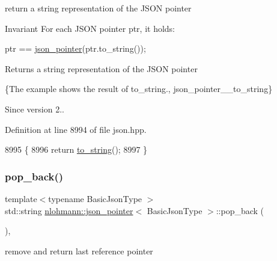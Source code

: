 return a string representation of the J\+S\+ON pointer 

\begin{DoxyInvariant}{Invariant}
For each J\+S\+ON pointer {\ttfamily ptr}, it holds\+: 
\begin{DoxyCode}
ptr == \hyperlink{classnlohmann_1_1json__pointer_a7f32d7c62841f0c4a6784cf741a6e4f8}{json\_pointer}(ptr.to\_string());
\end{DoxyCode}

\end{DoxyInvariant}
\begin{DoxyReturn}{Returns}
a string representation of the J\+S\+ON pointer
\end{DoxyReturn}
\{The example shows the result of {\ttfamily to\+\_\+string}., json\+\_\+pointer\+\_\+\+\_\+to\+\_\+string\}

\begin{DoxySince}{Since}
version 2.. 
\end{DoxySince}


Definition at line 8994 of file json.\+hpp.


\begin{DoxyCode}
8995     \{
8996         \textcolor{keywordflow}{return} \hyperlink{classnlohmann_1_1json__pointer_ad7d3a3a215db8fe0964e644a918dcccb}{to\_string}();
8997     \}
\end{DoxyCode}
\mbox{\label{classnlohmann_1_1json__pointer_a4d523606a8b40cef73e976e61b6fd383}} 
\subsubsection{\texorpdfstring{pop\+\_\+back()}{pop\_back()}}
{\footnotesize\ttfamily template$<$typename Basic\+Json\+Type $>$ \\
std\+::string \hyperlink{classnlohmann_1_1json__pointer}{nlohmann\+::json\+\_\+pointer}$<$ Basic\+Json\+Type $>$\+::pop\+\_\+back (\begin{DoxyParamCaption}{ }\end{DoxyParamCaption})\hspace{0.3cm}{\ttfamily [inline]}, {\ttfamily [private]}}



remove and return last reference pointer 


